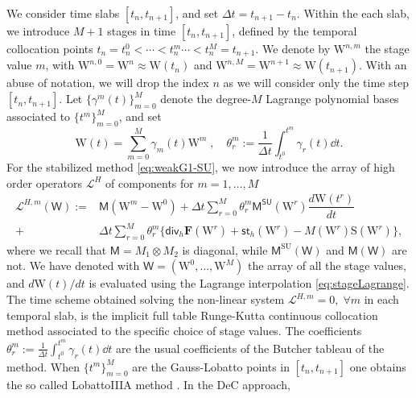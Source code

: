 \documentclass[a4paper,10pt]{article}
\begin{document}
We consider time slabs $[t_n,t_{n+1}]$, and set   $\Delta t= t_{n+1}- t_n $.   Within the each slab,
we  introduce  $M+1$ stages in time $[t_n,t_{n+1}]$, defined by the temporal collocation points $t_n=t_n^0< \cdots < t^m_n \cdots  < t^M_n=t_{n+1}$.
We denote by $\mathrm{W}^{n,m}$ the stage value $m$, with $\mathrm{W}^{n,0}= \mathrm{W}^n\approx \mathrm{W}(t_n)$ and  $\mathrm{W}^{n,M}= \mathrm{W}^{n+1}\approx \mathrm{W}(t_{n+1})$. With an abuse of notation, we will drop the index $n$ as we will consider only the time step $[t_n, t_{n+1}]$.  
Let $\{\gamma^m(t)\}_{m=0}^{M}$ denote the   degree-$M$ Lagrange  polynomial bases
associated to $\{t^m\}_{m=0}^{M}$, and set   
\begin{equation}\label{eq:stageLagrange}
\mathrm{W}(t) = \sum_{m=0}^{M} \gamma_m(t) \mathrm{W}^m\;,\quad
\theta^m_r:=\frac{1}{\Delta t}\int_{t^0}^{t^m} \gamma_r(t) \dd t.
\end{equation}
For the stabilized method \eqref{eq:weakG1-SU},  we now introduce the array of high order operators $\mathcal{L}^{H}$ of components for $m=1,\dots,M$
\begin{equation}
\begin{split}
	\mathcal{L}^{H,m}( \mathsf{W}  ) :=   &\mathsf{M}   (\mathrm{W}^m -  \mathrm{W}^0 )
	+ \Delta t \sum_{r=0}^M \theta_r^m \mathsf{M}^{\textsf{SU}}(\mathrm{W}^r) \dfrac{d\mathrm{W}(t^r)}{dt} \\
	+& \Delta t \sum_{r=0}^M \theta_r^m \{ \textsf{div}_h \mathbf{F}(\mathrm{W}^r)    + \mathsf{st}_h(\mathrm{W}^r)  -  M(\mathrm{W}^r )
	 \mathrm{S}(\mathrm{W}^r)\}  ,
	 \end{split}
\end{equation}
where we recall that $\mathsf{M} =  M_1\otimes M_2$ is diagonal, while $\mathsf{M}^\text{SU}(\mathsf{W})$ and $\mathsf{M}(\mathsf{W})$ are not. We have denoted  with $\mathsf{W} = (\mathrm{W}^{0}, \dots, \mathrm{W}^{M}) $ the array  of  all the stage values,  
and    $d \mathrm{W}(t)/dt$  is evaluated using the Lagrange interpolation \eqref{eq:stageLagrange}. 
The  time scheme obtained  solving the non-linear system  $\mathcal{L}^{H,m}=0,\;\forall m$ 
in each temporal  slab, is the    implicit full table Runge-Kutta continuous collocation method associated  to the specific choice of stage values. The coefficients $\theta^m_r:=\frac{1}{\Delta t}\int_{t^0}^{t^m} \gamma_r(t) \dd t$ are the usual coefficients of the Butcher tableau of the method.
When $\{t^m\}_{m=0}^{M}$ are the Gauss-Lobatto points in  $[t_n,t_{n+1}]$ one obtains the so called LobattoIIIA method \cite{Hairer1993}. In the DeC approach,
\end{document}
